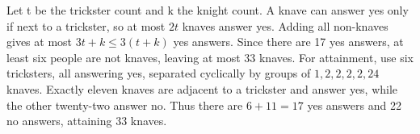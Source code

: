 Let t be the trickster count and k the knight count. A knave can answer yes only if next to a trickster, so at most $2t$ knaves answer yes. Adding all non-knaves gives at most $3t+k\le3(t+k)$ yes answers. Since there are 17 yes answers, at least six people are not knaves, leaving at most 33 knaves.
For attainment, use six tricksters, all answering yes, separated cyclically by groups of $1,2,2,2,2,24$ knaves. Exactly eleven knaves are adjacent to a trickster and answer yes, while the other twenty-two answer no. Thus there are $6+11=17$ yes answers and 22 no answers, attaining $\boxed{33}$ knaves.
